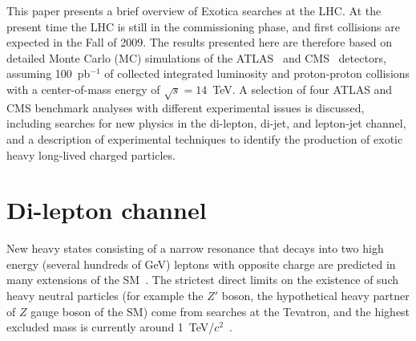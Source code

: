 \documentclass{cmspaper}
\begin{document}
This paper presents a brief overview of Exotica searches at the LHC. 
At the present time the LHC is still in the commissioning phase, 
and first collisions are expected in the Fall of 2009.
The results presented here are therefore based on detailed 
Monte Carlo (MC) simulations of the ATLAS~\cite{Aad:2009wy} and 
CMS~\cite{Bayatian:2006zz,Ball:2007zza} detectors, assuming 100~pb$^{-1}$ 
of collected integrated luminosity and proton-proton collisions 
with a center-of-mass energy of $\sqrt{s} = 14$~TeV. 
A selection of four ATLAS and CMS benchmark analyses with different 
experimental issues is discussed, including 
searches for new physics in the di-lepton, di-jet, and lepton-jet
channel, and a description of experimental techniques to identify the production of 
exotic heavy long-lived charged particles.


\section{Di-lepton channel} \label{dilepton}

New heavy states consisting of a narrow resonance that decays 
into two high energy (several hundreds of GeV) 
leptons with opposite charge are predicted in  
many extensions of the 
SM~\cite{Georgi:1974sy,ArkaniHamed:2001nc,Randall:1999ee,Lane:1999uh}.
The strictest direct limits on the existence of such 
heavy neutral particles (for example the $Z'$ boson, the hypothetical 
heavy partner of $Z$ gauge boson of the SM) come from searches 
at the Tevatron, and the highest excluded mass is currently around 
1~TeV/$c^2$~\cite{Aaltonen:2008vx,Aaltonen:2008ah,Abazov:2007ra}.
\end{document}
